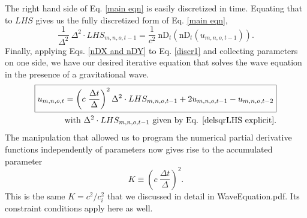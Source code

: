 \documentclass{article}
\begin{document}
The right hand side of Eq. \ref{main eqn} is easily discretized in time. Equating that to $LHS$ gives us the fully discretized form of Eq. \ref{main eqn},
\begin{equation} \label{discr1}
\frac{1}{\Delta^2}\ \Delta^2 \cdot LHS_{m,n,o,t-1} = \frac{1}{c^2}\ \mbox{nD}_t(\mbox{nD}_t(u_{m,n,o,t-1})).
\end{equation}
Finally, applying Eqs. \ref{nDX and nDY} to Eq. \ref{discr1} and collecting parameters on one side, we have our desired iterative equation that solves the wave equation in the presence of a gravitational wave.
\begin{align} \label{discr main eqn}
\boxed{
u_{m,n,o,t}=\left(c\ \frac{\Delta t}{\Delta}\right)^2 \Delta^2 \cdot LHS_{m,n,o,t-1}+2u_{m,n,o,t-1}-u_{m,n,o,t-2}
} \\
\text{with $\Delta^2 \cdot LHS_{m,n,o,t-1}$ given by Eq. \ref{delsqrLHS explicit}.} \nonumber
\end{align}
The manipulation that allowed us to program the numerical partial derivative functions independently of parameters now gives rise to the accumulated parameter
\begin{equation} \label{K}
K\equiv\left(c\ \frac{\Delta t}{\Delta}\right)^2.
\end{equation}
This is the same $K=c^2/c_i^2$ that we discussed in detail in WaveEquation.pdf. Its constraint conditions apply here as well.
\end{document}
